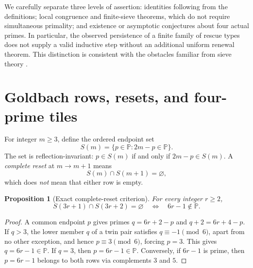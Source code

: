 \documentclass[11pt,a4paper]{article}
\newtheorem{proposition}[theorem]{Proposition}
\theoremstyle{definition}
\theoremstyle{remark}
\newcommand{\PP}{\mathbb P}
\begin{document}
We carefully separate three levels of assertion: identities following from the definitions; local congruence and finite-sieve theorems, which do not require simultaneous primality; and existence or asymptotic conjectures about four actual primes.  In particular, the observed persistence of a finite family of rescue types does not supply a valid inductive step without an additional uniform renewal theorem.  This distinction is consistent with the obstacles familiar from sieve theory \citep{HalberstamRichert1974,Maynard2015}.

\section{Goldbach rows, resets, and four-prime tiles}
For integer $m\ge3$, define the ordered endpoint set
\begin{equation}
 S(m)=\{p\in\PP:2m-p\in\PP\}.
\end{equation}
The set is reflection-invariant: $p\in S(m)$ if and only if $2m-p\in S(m)$. A \emph{complete reset} at $m\to m+1$ means
\begin{equation}\label{eq:reset}
 S(m)\cap S(m+1)=\varnothing,
\end{equation}
which does \emph{not} mean that either row is empty.

\begin{proposition}[Exact complete-reset criterion]\label{prop:reset}
For every integer $r\ge2$,
\begin{equation}
 S(3r+1)\cap S(3r+2)=\varnothing
 \quad\Longleftrightarrow\quad 6r-1\notin\PP.
\end{equation}
\end{proposition}
\begin{proof}
A common endpoint $p$ gives primes $q=6r+2-p$ and $q+2=6r+4-p$. If $q>3$, the lower member $q$ of a twin pair satisfies $q\equiv-1\pmod6$, apart from no other exception, and hence $p\equiv3\pmod6$, forcing $p=3$. This gives $q=6r-1\in\PP$.  If $q=3$, then $p=6r-1\in\PP$. Conversely, if $6r-1$ is prime, then $p=6r-1$ belongs to both rows via complements $3$ and $5$.
\end{proof}
\end{document}
